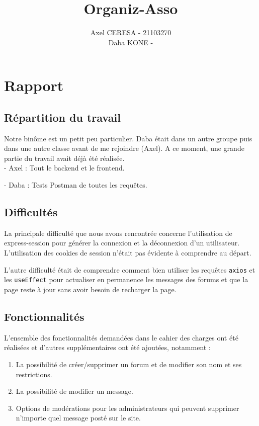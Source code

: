 \documentclass{article}
\title{Organiz-Asso}
\author{Axel CERESA - 21103270 \\ Daba KONE -}
\date{}
\begin{document}
\maketitle

\newpage

\section{Rapport}

\subsection{Répartition du travail}
Notre binôme est un petit peu particulier. Daba était dans un autre groupe puis dans une autre classe avant de me rejoindre (Axel). A ce moment, une grande partie du travail avait déjà été réalisée.\\

- Axel : Tout le backend et le frontend.

- Daba : Tests Postman de toutes les requêtes.

\subsection{Difficultés}
La principale difficulté que nous avons rencontrée concerne l'utilisation de express-session pour générer la connexion et la déconnexion d'un utilisateur. L'utilisation des cookies de session n'était pas évidente à comprendre au départ.

L'autre difficulté était de comprendre comment bien utiliser les requêtes \texttt{axios} et les \texttt{useEffect} pour actualiser en permanence les messages des forums et que la page reste à jour sans avoir besoin de recharger la page.

\subsection{Fonctionnalités}
L'ensemble des fonctionnalités demandées dans le cahier des charges ont été réalisées et d'autres supplémentaires ont été ajoutées, notamment :

\begin{enumerate}
    \item La possibilité de créer/supprimer un forum et de modifier son nom et ses restrictions.
    \item La possibilité de modifier un message.
    \item Options de modérations pour les administrateurs qui peuvent supprimer n'importe quel message posté sur le site.
\end{enumerate}
\end{document}
